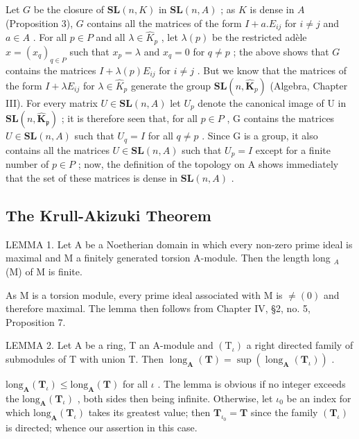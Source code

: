 Let \(G\) be the closure of \(\mathbf{SL}(n, K)\) in \(\mathbf{SL}(n, A)\) ; as \(K\) is dense in \(A\) (Proposition 3), \(G\) contains all the matrices of the form \(I + a.E_{ij}\) for \(i \neq j\) and \(a \in A\) . For all \(p \in P\) and all \(\lambda \in \hat{K}_p\) , let \(\lambda(p)\) be the restricted adèle \(x = (x_q)_{q \in P}\) such that \(x_p = \lambda\) and \(x_q = 0\) for \(q \neq p\) ; the above shows that \(G\) contains the matrices \(I + \lambda(p)E_{ij}\) for \(i \neq j\) . But we know that the matrices of the form \(I + \lambda E_{ij}\) for \(\lambda \in \hat{K}_p\) generate the group \(\mathbf{SL}(n, \hat{\mathbf{K}}_p)\) (Algebra, Chapter III). For every matrix \(U \in \mathbf{SL}(n, A)\) let \(U_{p}\) denote the canonical image of U in \(\mathbf{SL}(n, \hat{\mathbf{K}}_{\mathfrak{p}})\) ; it is therefore seen that, for all \(p \in P\) , G contains the matrices \(U \in \mathbf{SL}(n, A)\) such that \(U_{q} = I\) for all \(q \neq p\) . Since G is a group, it also contains all the matrices \(U \in \mathbf{SL}(n, A)\) such that \(U_{p} = I\) except for a finite number of \(p \in P\) ; now, the definition of the topology on A shows immediately that the set of these matrices is dense in \(\mathbf{SL}(n, A)\) .

\subsection{The Krull-Akizuki Theorem}

LEMMA 1. Let A be a Noetherian domain in which every non-zero prime ideal is maximal and M a finitely generated torsion A-module. Then the length long \(_{A}\) (M) of M is finite.

As M is a torsion module, every prime ideal associated with M is \(\neq(0)\) and therefore maximal. The lemma then follows from Chapter IV, §2, no. 5, Proposition 7.

LEMMA 2. Let A be a ring, T an A-module and \((\mathrm{T}_{\iota})\) a right directed family of submodules of T with union T. Then \(\operatorname{long}_{\mathbf{A}}(\mathbf{T}) = \sup (\operatorname{long}_{\mathbf{A}}(\mathbf{T}_{\iota}))\) .

\(\text{long}_{\mathbf{A}}(\mathbf{T}_{\iota}) \leqslant \text{long}_{\mathbf{A}}(\mathbf{T})\) for all \(\iota\) . The lemma is obvious if no integer exceeds the \(\text{long}_{\mathbf{A}}(\mathbf{T}_{\iota})\) , both sides then being infinite. Otherwise, let \(\iota_{0}\) be an index for which \(\text{long}_{\mathbf{A}}(\mathbf{T}_{\iota})\) takes its greatest value; then \(\mathbf{T}_{\iota_{0}} = \mathbf{T}\) since the family \((\mathbf{T}_{\iota})\) is directed; whence our assertion in this case.


